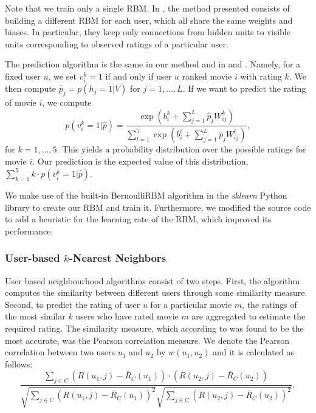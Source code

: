 \documentclass[10pt,conference,compsocconf]{IEEEtran}
\begin{document}
	Note that we train only a single RBM. In \cite{SMH07}, the method presented consists of building a different RBM for each user, which all share the same weights and biases. In particular, they keep only connections from hidden units to visible units corresponding to observed ratings of a particular user.
	
	The prediction algorithm is the same in our method and in \cite{SMH07} and \cite{L10}. Namely, for a fixed user $u$, we set $v^k_i=1$ if and only if user $u$ ranked movie $i$ with rating $k$. We then compute $\hat{p}_j=p(h_j=1|V)$ for $j=1,\dots, L$. If we want to predict the rating of movie $i$, we compute
	\begin{equation}
	p(v^k_i=1|\hat{p})=\frac{\exp(b^k_i+\sum_{j=1}^L \hat{p}_jW^k_{ij})}{\sum_{l=1}^{5}\exp(b^l_i+\sum_{j=1}^{L}\hat{p}_jW^l_{ij})},
	\end{equation}
	for $k=1,\dots, 5$. This yields a probability distribution over the possible ratings for movie $i$. Our prediction is the expected value of this distribution, $\sum_{k=1}^{5}k\cdot p(v^k_i=1|\hat{p})$.
	
	We make use of the built-in BernoulliRBM algorithm in the \emph{sklearn} Python library to create our RBM and train it. Furthermore, we modified the source code to add a heuristic for the learning rate of the RBM, which improved its performance.
	
	\subsubsection*{\textbf{User-based $k$-Nearest Neighbors}} User based neighbourhood algorithms consist of two steps. First, the algorithm computes the similarity between different users through some similarity measure. Second, to predict the rating of user $u$ for a particular movie $m$, the ratings of the most similar $k$ users who have rated movie $m$ are aggregated to estimate the required rating. The similarity measure, which according to \cite{L10} was found to be the most accurate, was the Pearson correlation measure. We denote the Pearson correlation between two users $u_1$ and $u_2$ by $w(u_1, u_2)$ and it is calculated as follows:
	\begin{equation} \label{eqn:pearson}
	\frac{\sum_{j \in C} (R(u_1, j) - \overline{R}_C(u_1))\cdot(R(u_2, j) - \overline{R}_C(u_2))}{\sqrt{\sum_{j \in C} (R(u_1, j) - \overline{R}_C(u_1))^2} \sqrt{\sum_{j \in C} (R(u_2, j) - \overline{R}_C(u_2))^2}},
	\end{equation}
	
\end{document}
